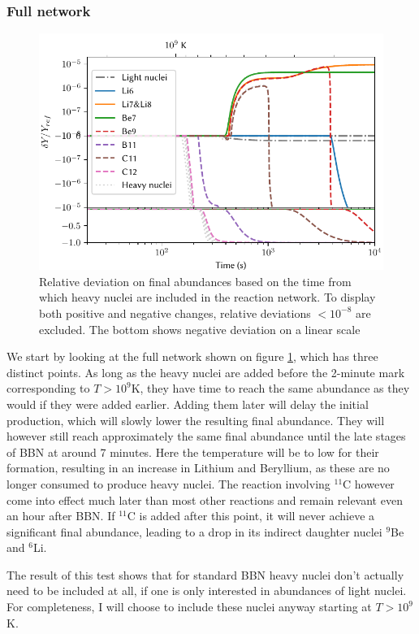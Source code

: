 \subsubsection{Full network}
\begin{figure}[ht!]
    \includegraphics[width=5.1in]{figures/Bignettime.pdf}
    \caption{Relative deviation on final abundances based on the time from which heavy nuclei are included in the reaction network. To display both positive and negative changes, relative deviations $ <10^{-8}$ are excluded. The bottom shows negative deviation on a linear scale}
    \label{fig:bignettime}
\end{figure}
We start by looking at the full network shown on figure \ref{fig:bignettime}, which has three distinct points. As long as the heavy nuclei are added before the 2-minute mark corresponding to $T>10^9$K, they have time to reach the same abundance as they would if they were added earlier. Adding them later will delay the initial production, which will slowly lower the resulting final abundance. They will however still reach approximately the same final abundance until the late stages of BBN at around 7 minutes. Here the temperature will be to low for their formation, resulting in an increase in Lithium and Beryllium, as these are no longer consumed to produce heavy nuclei. 
The reaction involving ${}^{11}$C however come into effect much later than most other reactions and remain relevant even an hour after BBN. If ${}^{11}$C is added after this point, it will never achieve a significant final abundance, leading to a drop in its indirect daughter nuclei ${}^{9}$Be and ${}^{6}$Li. 

The result of this test shows that for standard BBN heavy nuclei don't actually need to be included at all, if one is only interested in abundances of light nuclei. For completeness, I will choose to include these nuclei anyway starting at $T>10^9$K. 

